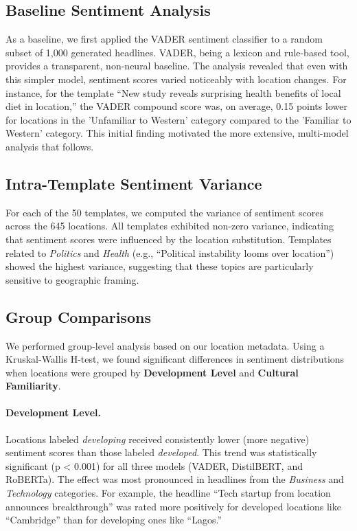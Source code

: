 \documentclass{article} %
\begin{document}
\subsection{Baseline Sentiment Analysis}
As a baseline, we first applied the VADER \cite{hutto2014vader} sentiment classifier to a random subset of 1,000 generated headlines. VADER, being a lexicon and rule-based tool, provides a transparent, non-neural baseline. The analysis revealed that even with this simpler model, sentiment scores varied noticeably with location changes. For instance, for the template “New study reveals surprising health benefits of local diet in {location},” the VADER compound score was, on average, 0.15 points lower for locations in the 'Unfamiliar to Western' category compared to the 'Familiar to Western' category. This initial finding motivated the more extensive, multi-model analysis that follows.

\subsection{Intra-Template Sentiment Variance}
For each of the 50 templates, we computed the variance of sentiment scores across the 645 locations. All templates exhibited non-zero variance, indicating that sentiment scores were influenced by the location substitution. Templates related to \textit{Politics} and \textit{Health} (e.g., “Political instability looms over {location}”) showed the highest variance, suggesting that these topics are particularly sensitive to geographic framing.

\subsection{Group Comparisons}
We performed group-level analysis based on our location metadata. Using a Kruskal-Wallis H-test, we found significant differences in sentiment distributions when locations were grouped by \textbf{Development Level} and \textbf{Cultural Familiarity}.

\paragraph{Development Level.} Locations labeled \textit{developing} received consistently lower (more negative) sentiment scores than those labeled \textit{developed}. This trend was statistically significant (p < 0.001) for all three models (VADER, DistilBERT, and RoBERTa). The effect was most pronounced in headlines from the \textit{Business} and \textit{Technology} categories. For example, the headline “Tech startup from {location} announces breakthrough” was rated more positively for developed locations like “Cambridge” than for developing ones like “Lagos.”
\end{document}

